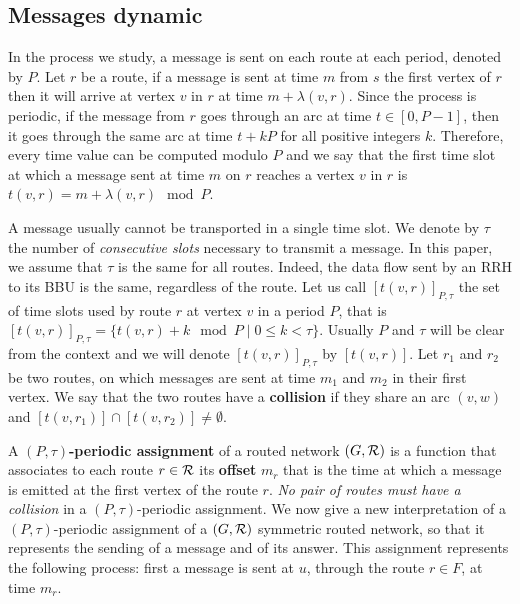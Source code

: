 \documentclass[10pt, conference, letterpaper]{IEEEtran}
\begin{document}
   \subsection{Messages dynamic}
      
      In the process we study, a message is sent on each route at each period, denoted by $P$.
      Let $r$ be a route, if a message is sent at time $m$ from $s$ the first vertex of $r$ then it will arrive at vertex $v$ in $r$ at time $m + \lambda(v,r)$. Since the process is periodic, if the message from $r$ goes through an arc at time $t\in [0,P-1]$, 
      then it goes through the same arc at time $t+kP$ for all positive integers $k$. Therefore, every time value can be computed modulo $P$ and we say that the first time slot at which a message sent at time $m$ on $r$ reaches a vertex $v$ in $r$ is $t(v,r) = m + \lambda(v,r)\mod P$. 
      
      A message usually cannot be transported in a single time slot. We denote by $\tau$ the number 
      of \emph{consecutive slots} necessary to transmit a message. In this paper, we assume that $\tau$ is the same for all routes. Indeed, the data flow sent by an RRH to its BBU is the same, regardless of the route. Let us call $[t(v,r)]_{P,\tau}$ the set of time slots used by route $r$ at vertex $v$ in a period $P$, that is $[t(v,r)]_{P,\tau} = \{t(v,r) + k \mod P \mid 0 \leq k < \tau \}$. Usually $P$ and $\tau$ will be clear from the context and we will denote $[t(v,r)]_{P,\tau}$ by $[t(v,r)]$.
      Let $r_1$ and $r_2$ be two routes, on which messages are sent at time $m_1$ and $m_2$ in their first vertex.
      We say that the two routes have a {\bf collision} if they share an arc $(v,w)$ and $[t(v,r_{1})] \cap [t(v,r_{2})] \neq \emptyset$.
      
         A {\bf $(P,\tau)$-periodic assignment} of a routed network $(G,\cal R)$ is a function that associates to each route 
         $r \in \cal R$ its \textbf{offset} $m_r$ that is the time at which a message is emitted at the first vertex of the route $r$. \emph{No pair of routes must have a collision} in a $(P,\tau)$-periodic assignment.
                     We now give a new interpretation of a $(P,\tau)$-periodic assignment of a $(G,{\cal R})$ symmetric routed network, so that it represents the sending of a message and of its answer.
	This assignment represents the following process: first a message is sent at $u$, through the route $r \in F$, at time $m_r$.
       
  
\end{document}

